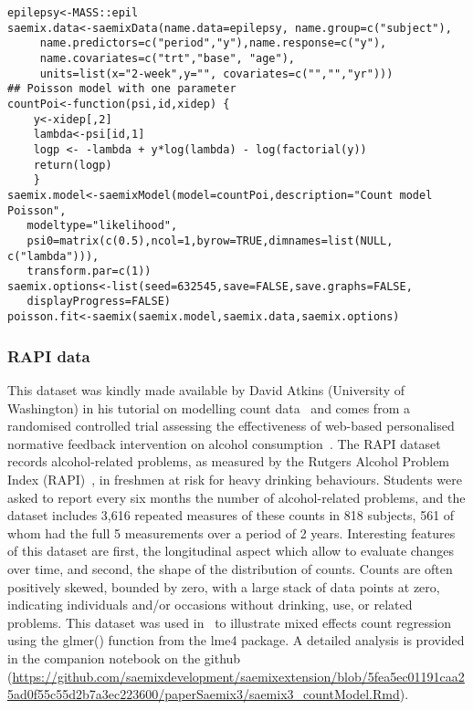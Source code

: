 \begin{verbatim}
epilepsy<-MASS::epil
saemix.data<-saemixData(name.data=epilepsy, name.group=c("subject"),
     name.predictors=c("period","y"),name.response=c("y"),
     name.covariates=c("trt","base", "age"), 
     units=list(x="2-week",y="", covariates=c("","","yr")))
## Poisson model with one parameter
countPoi<-function(psi,id,xidep) { 
    y<-xidep[,2]
    lambda<-psi[id,1]
    logp <- -lambda + y*log(lambda) - log(factorial(y))
    return(logp)
    }
saemix.model<-saemixModel(model=countPoi,description="Count model Poisson",
   modeltype="likelihood", 
   psi0=matrix(c(0.5),ncol=1,byrow=TRUE,dimnames=list(NULL, c("lambda"))), 
   transform.par=c(1))
saemix.options<-list(seed=632545,save=FALSE,save.graphs=FALSE, 
   displayProgress=FALSE)
poisson.fit<-saemix(saemix.model,saemix.data,saemix.options)
\end{verbatim}

\subsubsection{RAPI data} \label{sec:RAPICount}


This dataset was kindly made available by David Atkins (University of Washington) in his tutorial on modelling count data~\cite{Atkins13} and comes from a randomised controlled trial assessing the effectiveness of web-based personalised normative feedback intervention on alcohol consumption~\cite{Neighbors10a, Neighbors10b}. The {\sf RAPI dataset} records alcohol-related problems, as measured by the Rutgers Alcohol Problem Index (RAPI)~\cite{White89}, in freshmen at risk for heavy drinking behaviours. Students were asked to report every six months the number of alcohol-related problems, and the dataset includes 3,616 repeated measures of these counts in 818 subjects, 561 of whom had the full 5 measurements over a period of 2 years. Interesting features of this dataset are first, the longitudinal aspect which allow to evaluate changes over time, and second, the shape of the distribution of counts. Counts are often positively skewed, bounded by zero, with a large stack of data points at zero, indicating individuals and/or occasions without drinking, use, or related problems. This dataset was used in~\cite{Atkins13} to illustrate mixed effects count regression using the {\sf glmer()} function from the {\sf lme4} package. A detailed analysis is provided in the companion notebook on the github (\url{https://github.com/saemixdevelopment/saemixextension/blob/5fea5ec01191caa25ad0f55c55d2b7a3ec223600/paperSaemix3/saemix3_countModel.Rmd}).

